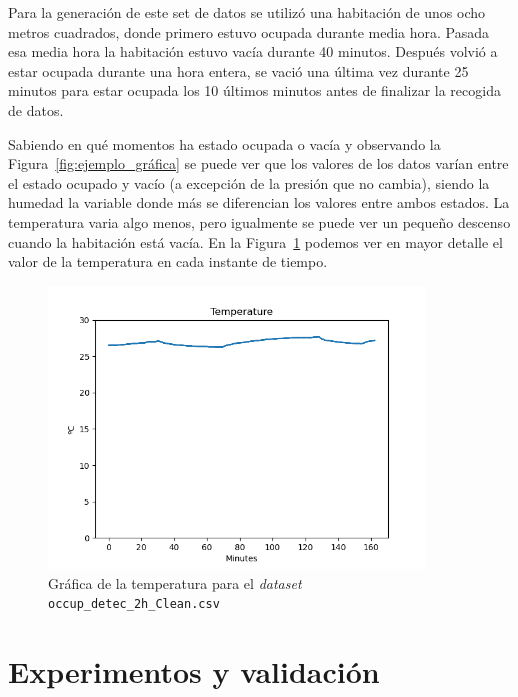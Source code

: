 \documentclass[a4paper, 12pt]{book}
\begin{document}
Para la generación de este set de datos se utilizó una habitación de unos ocho metros cuadrados, donde primero estuvo ocupada durante media hora. Pasada esa media hora la habitación estuvo vacía durante 40 minutos. Después volvió a estar ocupada durante una hora entera, se vació una última vez durante 25 minutos para estar ocupada los 10 últimos minutos antes de finalizar la recogida de datos.

Sabiendo en qué momentos ha estado ocupada o vacía y observando la Figura~\ref{fig:ejemplo_gráfica} se puede ver que los valores de los datos varían entre el estado ocupado y vacío (a excepción de la presión que no cambia), siendo la humedad la variable donde más se diferencian los valores entre ambos estados. La temperatura varia algo menos, pero igualmente se puede ver un pequeño descenso cuando la habitación está vacía. En la Figura~\ref{fig:graf_temp} podemos ver en mayor detalle el valor de la temperatura en cada instante de tiempo.

\begin{figure}[htb]
  \centering
  \includegraphics[width=10cm, keepaspectratio]{img/Temp_occup_detec_2h_original.png}
  \caption{Gráfica de la temperatura para el \textit{dataset} \texttt{occup\_detec\_2h\_Clean.csv}}\label{fig:graf_temp}
\end{figure}

\cleardoublepage


\chapter{Experimentos y validación}
\label{chap:experimentos}
\end{document}
